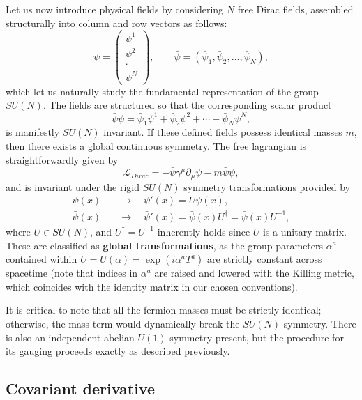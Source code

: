 Let us now introduce physical fields by considering \(N\) free Dirac fields, assembled structurally into column and row vectors as follows:
\[
    \psi = \begin{pmatrix} \psi^1 \\ \psi^2 \\ \cdot \\ \psi^N \end{pmatrix} , \qquad \bar{\psi} = (\bar{\psi}_1, \bar{\psi}_2, \ldots, \bar{\psi}_N),
\]
which let us naturally study the fundamental representation of the group \(SU(N)\). The fields are structured so that the corresponding scalar product
\[
    \bar{\psi}\psi = \bar{\psi}_1\psi^1 + \bar{\psi}_2\psi^2 + \cdots + \bar{\psi}_N\psi^N,
\]
is manifestly \(SU(N)\) invariant. \uline{If these defined fields possess identical masses \(m\), then there exists a global continuous symmetry}. The free lagrangian is straightforwardly given by
\begin{equation} \label{eq:free_lagrangian}
    \mathcal{L}_{Dirac} = -\bar{\psi}\gamma^\mu\partial_\mu\psi - m\bar{\psi}\psi,
\end{equation}
and is invariant under the rigid \(SU(N)\) symmetry transformations provided by
\begin{equation} \label{eq:global_transform}
    \begin{aligned}
        \psi(x) \quad       & \rightarrow \quad \psi'(x) = U\psi(x),                                           \\
        \bar{\psi}(x) \quad & \rightarrow \quad \bar{\psi}'(x) = \bar{\psi}(x)U^\dagger = \bar{\psi}(x)U^{-1},
    \end{aligned}
\end{equation}
where \(U \in SU(N)\), and \(U^\dagger = U^{-1}\) inherently holds since \(U\) is a unitary matrix. These are classified as \textbf{global transformations}, as the group parameters \(\alpha^a\) contained within \(U = U(\alpha) = \exp(i\alpha^a T^a)\) are strictly constant across spacetime (note that indices in \(\alpha^a\) are raised and lowered with the Killing metric, which coincides with the identity matrix in our chosen conventions).

It is critical to note that all the fermion masses must be strictly identical; otherwise, the mass term would dynamically break the \(SU(N)\) symmetry. There is also an independent abelian \(U(1)\) symmetry present, but the procedure for its gauging proceeds exactly as described previously.

\subsection{Covariant derivative}

